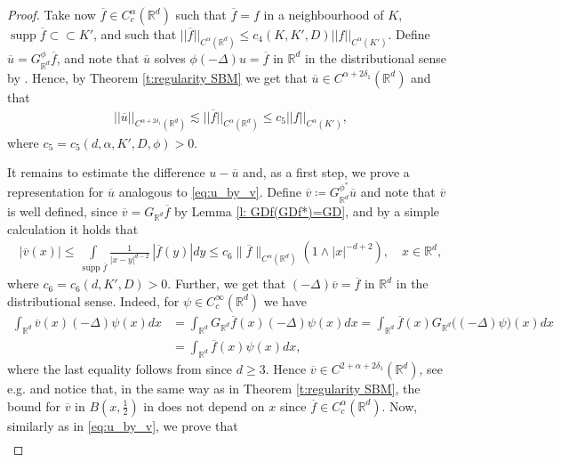 \documentclass[12pt,a4paper,onecolumn]{amsart}
\DeclareMathOperator\supp{supp}
\theoremstyle{definition}
\newcommand{\R}{\mathbb{R}}
\newcommand{\subsub}{\subset\subset}
\newcommand{\1}{\mathbf 1}
\newcommand{\LoR}{\phi(-\Delta)}
\numberwithin{equation}{section}
\begin{document}
\begin{proof}
    Take now $\overline f\in C_c^\alpha(\R^d)$ such that $\overline f=f$ in  a neighbourhood of $K$, $\supp \overline f\subsub  K' $, and such that $|| \overline f||_{C^\alpha(\R^d)}\le c_4(K,K',D)||f||_{C^\alpha(K')}$. Define $\overline u=G_{\R^d}^\phi \overline f$, and note that $\overline u$ solves $\LoR u=\overline f$ in $\R^d$ in the distributional sense by \cite[Proposition 2.5]{Bio22}. Hence, by Theorem \ref{t:regularity SBM} we get that $\overline u\in C^{\alpha+2\delta_1}(\R^d)$ and that 
    \begin{align}\label{eq:overline u smooth}
        ||\overline u||_{C^{\alpha+2\delta_1}(\R^d)}\lesssim||\overline f||_{C^{\alpha}(\R^d)}\le c_5||f||_{C^\alpha(K')},
    \end{align}
     where $c_5=c_5(d,\alpha,K',D,\phi)>0$. 
     
 It remains to estimate the difference $u-\overline u$ and, as a first step, we prove a representation for $\overline u$ analogous to \eqref{eq:u_by_v}. Define $\overline v\coloneqq G_{\R^d}^{\phi^*}\overline u$ and note that $\overline v$ is well defined,  since $\overline v=G_{\R^d}\overline f$ by Lemma \ref{l: GDf(GDf*)=GD}, and by a simple calculation it holds that 
    \begin{align}\label{eq:overline v integrability no2}
		|\overline v(x)|\le \int\limits_{\supp \overline f}\frac{1}{|x-y|^{d-2}}\,|\overline f(y)|dy\le c_6\|\overline f\|_{C^\alpha(\R^d)}(1\wedge |x|^{-d+2}), \quad x \in \R^d,
	\end{align}
	where $c_6=c_6(d,K',D)>0$.
Further, we get that $(-\Delta)\overline v=\overline f$ in $\R^d$ in the distributional sense. Indeed, for $\psi \in C_c^\infty(\R^d)$ we have
	\begin{align*}
		\int_{\R^d}\overline v(x)(-\Delta)\psi(x)dx&=\int_{\R^d}G_{\R^d}\overline f(x)(-\Delta)\psi(x)dx=\int_{\R^d} \overline f(x)G_{\R^d} \big((-\Delta)\psi\big)(x)dx\\
  &=\int_{\R^d}\overline f(x)\psi(x)dx,
	\end{align*}
	where the last equality follows from \cite[Proposition 2.8]{chung_zhao} since $d\ge 3$. Hence $\overline v \in C^{2+\alpha+2\delta_1}(\R^d)$, see e.g. \cite[Corollary 2.17]{RosOtonFernRegularBook} and notice that, in the same way as in Theorem \ref{t:regularity SBM}, the bound for $\overline v$ in $B(x,\frac12)$ in \cite[Corollary 2.17]{RosOtonFernRegularBook} does not depend on $x$ since $\overline f\in C_c^{\alpha}({\R^d})$. Now, similarly as in \eqref{eq:u_by_v}, we prove that
	\begin{align*}

\end{align*}
\end{proof}
\end{document}

